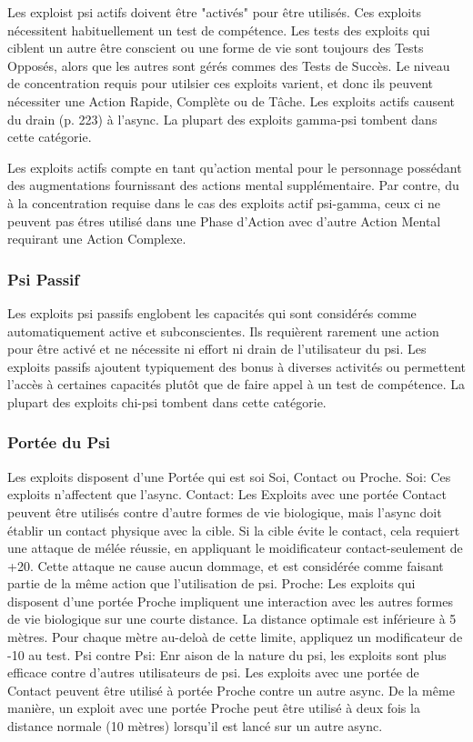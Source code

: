 Les exploist psi actifs doivent être "activés" pour être utilisés. Ces exploits nécessitent habituellement un test de compétence. Les tests des exploits qui ciblent un autre être conscient ou une forme de vie sont toujours des Tests Opposés, alors que les autres sont gérés commes des Tests de Succès. Le niveau de concentration requis pour utilsier ces exploits varient, et donc ils peuvent nécessiter une Action Rapide, Complète ou de Tâche. Les exploits actifs causent du drain (p. 223) à l'async. La plupart des exploits gamma-psi tombent dans cette catégorie. 

Les exploits actifs compte en tant qu'action mental pour le personnage possédant des augmentations fournissant des actions mental supplémentaire. Par contre, du à la concentration requise dans le cas des exploits actif psi-gamma, ceux ci ne peuvent pas étres utilisé dans une Phase d'Action avec d'autre Action Mental requirant une Action Complexe. 

\subsubsection{Psi Passif} 

Les exploits psi passifs englobent les capacités qui sont considérés comme automatiquement active et subconscientes. Ils requièrent rarement une action pour être activé et ne nécessite ni effort ni drain de l'utilisateur du psi. Les exploits passifs ajoutent typiquement des bonus à diverses activités ou permettent l'accès à certaines capacités plutôt que de faire appel à un test de compétence. La plupart des exploits chi-psi tombent dans cette catégorie. 

\subsubsection{Portée du Psi} 

Les exploits disposent d'une Portée qui est soi Soi, Contact ou Proche. Soi: Ces exploits n'affectent que l'async. Contact: Les Exploits avec une portée Contact peuvent être utilisés contre d'autre formes de vie biologique, mais l'async doit établir un contact physique avec la cible. Si la cible évite le contact, cela requiert une attaque de mélée réussie, en appliquant le moidificateur contact-seulement de +20. Cette attaque ne cause aucun dommage, et est considérée comme faisant partie de la même action que l'utilisation de psi. Proche: Les exploits qui disposent d'une portée Proche impliquent une interaction avec les autres formes de vie biologique sur une courte distance. La distance optimale est inférieure à 5 mètres. Pour chaque mètre au-deloà de cette limite, appliquez un modificateur de -10 au test. Psi contre Psi: Enr aison de la nature du psi, les exploits sont plus efficace contre d'autres utilisateurs de psi. Les exploits avec une portée de Contact peuvent être utilisé à portée Proche contre un autre async. De la même manière, un exploit avec une portée Proche peut être utilisé à deux fois la distance normale (10 mètres) lorsqu'il est lancé sur un autre async. 

